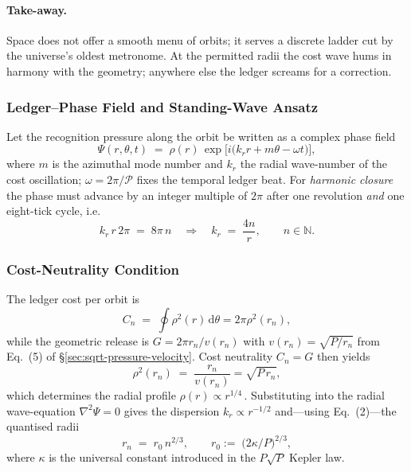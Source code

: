 \documentclass[11pt,oneside]{book}
\begin{document}
\paragraph{Take-away.}
Space does not offer a smooth menu of orbits; it serves a discrete
ladder cut by the universe’s oldest metronome.  
At the permitted radii the cost wave hums in harmony with the
geometry; anywhere else the ledger screams for a correction.



\subsubsection{Ledger–Phase Field and Standing-Wave Ansatz}
\label{ss:ladder-phase-field}

Let the recognition pressure along the orbit be written as a complex
phase field
\[
   \Psi(r,\theta,t)
   \;=\;
   \rho(r)\,
   \exp\!\bigl[
      i\bigl(k_{r}r + m\theta - \omega t\bigr)
   \bigr],
   \tag{1}
\]
where $m$ is the azimuthal mode number and $k_{r}$ the radial
wave-number of the cost oscillation; $\omega=2\pi/\mathscr{P}$ fixes
the temporal ledger beat.  
For \emph{harmonic closure} the phase must advance by an integer
multiple of $2\pi$ after one revolution \emph{and} one eight-tick
cycle, i.e.
\[
   k_{r}\,r\,2\pi
   \;=\;
   8\pi\,n
   \quad\Longrightarrow\quad
   k_{r}
   \;=\;
   \frac{4n}{r},
   \qquad
   n\in\mathbb N.
   \tag{2}
\]

\subsubsection{Cost-Neutrality Condition}
\label{ss:ladder-cost-neutral}

The ledger cost per orbit is
\[
   C_{n}
   \;=\;
   \oint\!\rho^{2}(r)\,\mathrm d\theta
   =
   2\pi\rho^{2}(r_{n}),
   \tag{3}
\]
while the geometric release is
$G=2\pi r_{n}/v(r_{n})$ with
$v(r_{n})=\sqrt{P/r_{n}}$ from
Eq.~(5) of §\ref{sec:sqrt-pressure-velocity}.  
Cost neutrality $C_{n}=G$ then yields
\[
   \rho^{2}(r_{n})
   \;=\;
   \frac{r_{n}}{v(r_{n})}
   =
   \sqrt{P\,r_{n}},
   \tag{4}
\]
which determines the radial profile
\(\rho(r)\propto r^{1/4}\)\,.  Substituting into the radial
wave-equation $\nabla^{2}\Psi=0$ gives the dispersion
$k_{r}\propto r^{-1/2}$ and—using Eq.~(2)—the quantised radii
\[
   r_{n}
   \;=\;
   r_{0}\,n^{2/3},
   \qquad
   r_{0}
   :=\;\bigl(2\kappa/P\bigr)^{2/3},
   \tag{5}
\]
where $\kappa$ is the universal constant introduced in the
\(P\sqrt{P}\) Kepler law.
\end{document}
